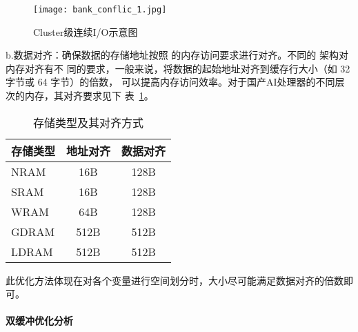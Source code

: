 \begin{figure}[ht]
    \centering
 \texttt{[image: bank\_conflic\_1.jpg]}
    \caption{Cluster级连续I/O示意图}
    \label{fig:bank_conflic}
\end{figure}





b.数据对齐：确保数据的存储地址按照 的内存访问要求进行对齐。不同的 架构对内存对齐有不
同的要求，一般来说，将数据的起始地址对齐到缓存行大小（如 32 字节或 64 字节）的倍数，
可以提高内存访问效率。对于国产AI处理器的不同层次的内存，其对齐要求见下
表~\ref{tab:alignment}。

\begin{table}
    \caption{存储类型及其对齐方式}
    \centering
    \begin{tabular}{lcc}
    \toprule
    存储类型 & 地址对齐 & 数据对齐 \\
    \midrule
    NRAM & 16B & 128B \\
    SRAM & 16B & 128B \\
    WRAM & 64B & 128B \\
    GDRAM & 512B & 512B \\
    LDRAM & 512B & 512B \\
    \bottomrule
    \end{tabular}

    \label{tab:alignment}
    \end{table}
此优化方法体现在对各个变量进行空间划分时，大小尽可能满足数据对齐的倍数即可。


\paragraph{双缓冲优化分析}


